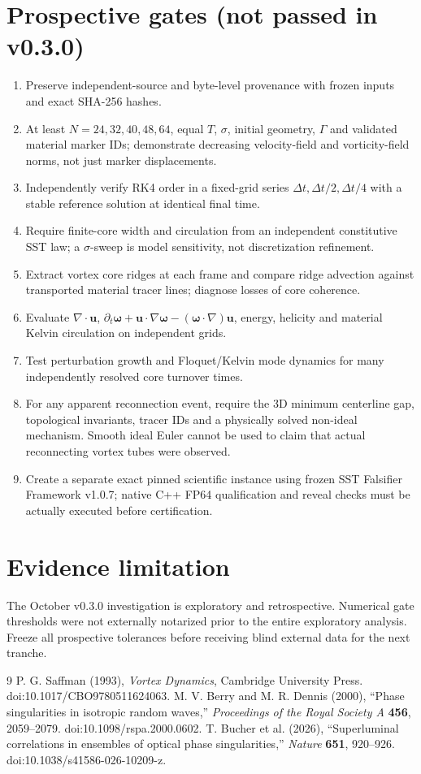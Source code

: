 \documentclass[11pt,a4paper]{article}
\begin{document}
\section*{Prospective gates (not passed in v0.3.0)}
\begin{enumerate}
\item Preserve independent-source and byte-level provenance with frozen inputs and exact SHA-256 hashes.
\item At least $N=24,32,40,48,64$, equal $T$, $\sigma$, initial geometry, $\Gamma$ and validated material marker IDs; demonstrate decreasing velocity-field and vorticity-field norms, not just marker displacements.
\item Independently verify RK4 order in a fixed-grid series $\Delta t,\Delta t/2,\Delta t/4$ with a stable reference solution at identical final time.
\item Require finite-core width and circulation from an independent constitutive SST law; a $\sigma$-sweep is model sensitivity, not discretization refinement.
\item Extract vortex core ridges at each frame and compare ridge advection against transported material tracer lines; diagnose losses of core coherence.
\item Evaluate $\nabla\cdot\mathbf{u}$, $\partial_t\boldsymbol\omega+\mathbf u\cdot\nabla\boldsymbol\omega-(\boldsymbol\omega\cdot\nabla)\mathbf u$, energy, helicity and material Kelvin circulation on independent grids.
\item Test perturbation growth and Floquet/Kelvin mode dynamics for many independently resolved core turnover times.
\item For any apparent reconnection event, require the 3D minimum centerline gap, topological invariants, tracer IDs and a physically solved non-ideal mechanism. Smooth ideal Euler cannot be used to claim that actual reconnecting vortex tubes were observed.
\item Create a separate exact pinned scientific instance using frozen SST Falsifier Framework v1.0.7; native C++ FP64 qualification and reveal checks must be actually executed before certification.
\end{enumerate}
\section*{Evidence limitation}
The October v0.3.0 investigation is exploratory and retrospective. Numerical gate thresholds were not externally notarized prior to the entire exploratory analysis. Freeze all prospective tolerances before receiving blind external data for the next tranche.
\begin{thebibliography}{9}
 P. G. Saffman (1993), \emph{Vortex Dynamics}, Cambridge University Press. doi:10.1017/CBO9780511624063.
 M. V. Berry and M. R. Dennis (2000), ``Phase singularities in isotropic random waves,'' \emph{Proceedings of the Royal Society A} \textbf{456}, 2059--2079. doi:10.1098/rspa.2000.0602.
 T. Bucher et al. (2026), ``Superluminal correlations in ensembles of optical phase singularities,'' \emph{Nature} \textbf{651}, 920--926. doi:10.1038/s41586-026-10209-z.
\end{thebibliography}
\end{document}
